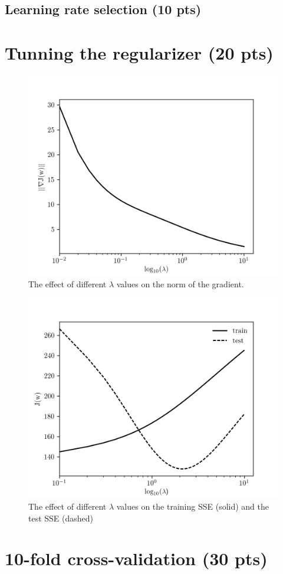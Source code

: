\documentclass{article}
\begin{document}
\subsection{Learning rate selection (10 pts)}

\section{Tunning the regularizer (20 pts)}

\begin{figure}[htp]
\centering
\includegraphics[width=\textwidth]{norm_lambda.png}
\caption{The effect of different $\lambda$ values on the norm of the gradient.}
\end{figure}

\begin{figure}[htp]
\centering
\includegraphics[width=\textwidth]{test_lambda.png}
\caption{The effect of different $\lambda$ values on the training SSE (solid) and the test SSE (dashed)}
\end{figure}

\section{10-fold cross-validation (30 pts)}
\end{document}
